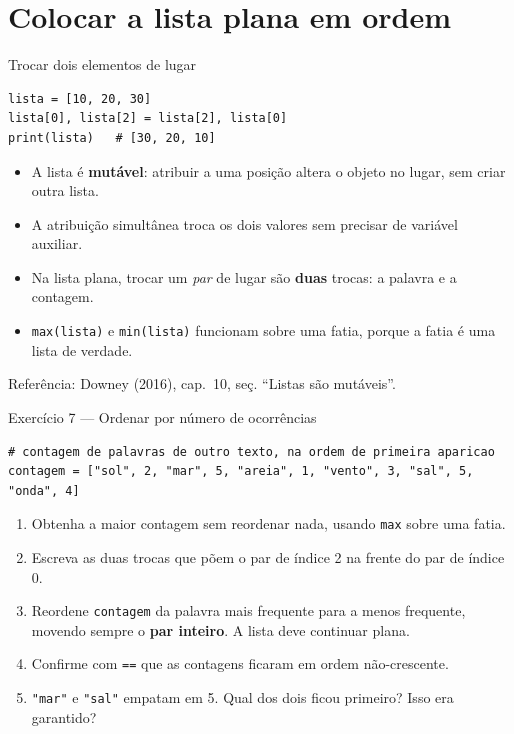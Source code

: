 \documentclass[aspectratio=169]{beamer}
\newcommand{\fonte}[1]{\vfill{\scriptsize\color{UFSGray}Refer\^encia: #1}}
\begin{document}
\section{Colocar a lista plana em ordem}

\begin{frame}[fragile]{Trocar dois elementos de lugar}
\begin{lstlisting}
lista = [10, 20, 30]
lista[0], lista[2] = lista[2], lista[0]
print(lista)   # [30, 20, 10]
\end{lstlisting}

\begin{itemize}
  \item A lista é \textbf{mutável}: atribuir a uma posição altera o objeto no lugar, sem criar outra lista.
  \item A atribuição simultânea troca os dois valores sem precisar de variável auxiliar.
  \item Na lista plana, trocar um \emph{par} de lugar são \textbf{duas} trocas: a palavra e a contagem.
  \item \texttt{max(lista)} e \texttt{min(lista)} funcionam sobre uma fatia, porque a fatia é uma lista de verdade.
\end{itemize}

\fonte{Downey (2016), cap.\ 10, se\c{c}. ``Listas s\~ao mut\'aveis''.}
\end{frame}

\begin{frame}[fragile]{Exercício 7 --- Ordenar por número de ocorrências}
\begin{lstlisting}
# contagem de palavras de outro texto, na ordem de primeira aparicao
contagem = ["sol", 2, "mar", 5, "areia", 1, "vento", 3, "sal", 5, "onda", 4]
\end{lstlisting}

\begin{enumerate}
  \item Obtenha a maior contagem sem reordenar nada, usando \texttt{max} sobre uma fatia.
  \item Escreva as duas trocas que põem o par de índice 2 na frente do par de índice 0.
  \item Reordene \texttt{contagem} da palavra mais frequente para a menos frequente, movendo sempre o \textbf{par inteiro}. A lista deve continuar plana.
  \item Confirme com \texttt{==} que as contagens ficaram em ordem não-crescente.
  \item \texttt{"mar"} e \texttt{"sal"} empatam em 5. Qual dos dois ficou primeiro? Isso era garantido?
\end{enumerate}
\end{frame}
\end{document}
